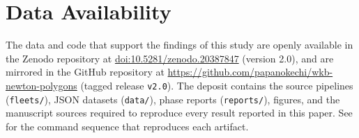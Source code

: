 \documentclass[aip,jmp,preprint,amsmath,amssymb,nofootinbib,floatfix]{revtex4-2}
\theoremstyle{plain}
\theoremstyle{definition}
\theoremstyle{remark}
\begin{document}
\section*{Data Availability}\label{sec:dataavail}

The data and code that support the findings of this study are openly
available in the Zenodo repository at
\href{https://doi.org/10.5281/zenodo.20387847}{doi:10.5281/zenodo.20387847}
(version 2.0), and are mirrored in the GitHub repository at
\url{https://github.com/papanokechi/wkb-newton-polygons} (tagged
release \texttt{v2.0}). The deposit contains the source pipelines
(\texttt{fleets/}), JSON datasets (\texttt{data/}), phase reports
(\texttt{reports/}), figures, and the manuscript sources required to
reproduce every result reported in this paper. See
 for the command sequence that reproduces
each artifact.



\end{document}
